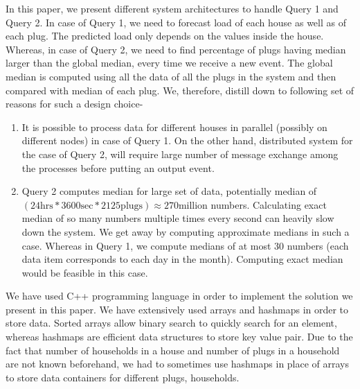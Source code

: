 In this paper, we present different system architectures to handle Query 1 and Query 2. In case of Query 1, we need to forecast load of each house as well as of each plug. The predicted load only depends on the values inside the house. Whereas, in case of Query 2, we need to find percentage of plugs having median larger than the global median, every time we receive a new event. The global median is computed using all the data of all the plugs in the system and then compared with median of each plug. We, therefore, distill down to following set of reasons for such a design choice-

\begin{enumerate}
\item It is possible to process data for different houses in parallel (possibly on different nodes) in case of Query 1. On the other hand, distributed system for the case of Query 2, will require large number of message exchange among the processes before putting an output event.
\item Query 2 computes median for large set of data, potentially median of $(24 \mbox{hrs} * 3600 \mbox{sec} * 2125 \mbox{plugs}) \approx 270 \mbox{million}$ numbers. Calculating exact median of so many numbers multiple times every second can heavily slow down the system. We get away by computing approximate medians in such a case. Whereas in Query 1, we compute medians of at most 30 numbers (each data item corresponds to each day in the month). Computing exact median would be feasible in this case.
\end{enumerate}

We have used C++ programming language in order to implement the solution we present in this paper. We have extensively used arrays and hashmaps in order to store data. Sorted arrays allow binary search to quickly search for an element, whereas hashmaps are efficient data structures to store key value pair. Due to the fact that number of households in a house and number of plugs in a household are not known beforehand, we had to sometimes use hashmaps in place of arrays to store data containers for different plugs, households.
